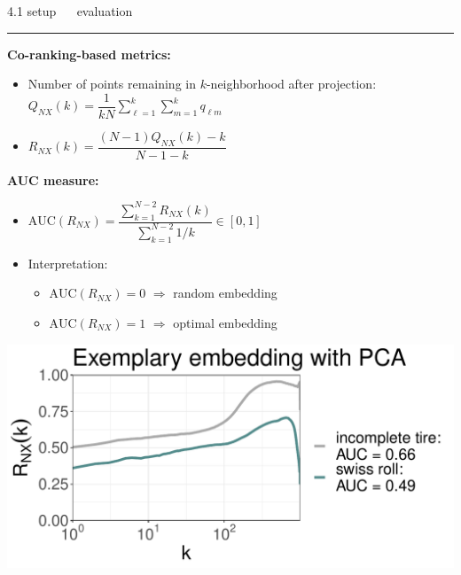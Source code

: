 \documentclass[11pt, compress, t, notes = noshow, xcolor = table, 
aspectratio = 1610]{beamer}
\newcommand{\highlight}[1]{\textcolor{highlightcol}{\textbf{#1}}}
\newcommand{\arritem}{\item[\highlight{$\rightarrow$}]}
\newcommand{\flexitem}[1]{\item[$\highlight{#1}$]}
\begin{document}
\LARGE
\begin{frame}{\textcolor{gray!90}{4.1 setup} ~~ evaluation}
\normalsize
\vspace{-0.5cm}
\noindent \textcolor{gray!90}{\rule{\textwidth}{1pt}}
\smallskip

\textbf{Co-ranking-based metrics:}

\begin{itemize}
  \arritem Number of points remaining in $k$-neighborhood after projection: 
  $Q_{NX}(k) = \dfrac{1}{kN} \sum_{\ell = 1}^k \sum_{m = 1}^k 
  q_{\ell m}$
  \arritem 
  $R_{NX}(k) = \dfrac{(N - 1) Q_{NX}(k) - k}{N - 1 - k}$
\end{itemize}

\vspace{0.3cm}

\begin{minipage}[b]{0.6\textwidth}
  \textbf{AUC measure:} %
  \begin{itemize}
    \arritem $\text{AUC}(R_{NX}) = \dfrac{\sum_{k = 1}^{N - 2} R_{NX}(k)}{
    \sum_{k = 1}^{N - 2} 1 / k} \in [0, 1]$
    \arritem Interpretation:
    \begin{itemize}
      \flexitem{1} $\text{AUC}(R_{NX}) = 0$ $\Rightarrow$ random embedding
      \flexitem{2} $\text{AUC}(R_{NX}) = 1$ $\Rightarrow$ optimal embedding
    \end{itemize}
\end{itemize}
\end{minipage}%
\begin{minipage}[b]{0.4\textwidth}
  \includegraphics[trim = 0 0 0 0, clip, %
    width = \textwidth]{figures/rnx_curve}
\end{minipage}

\end{frame}
\end{document}

